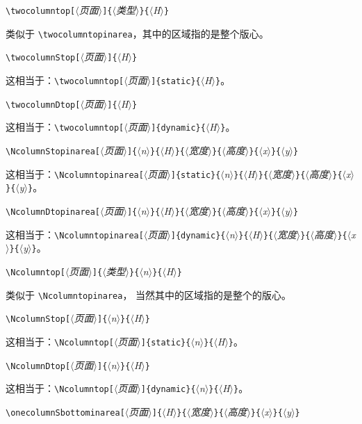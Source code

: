\documentclass[a4paper]{book}%
\newcommand{\meta}[1]{\textnormal{\ensuremath{\langle}\makebox[0pt][l]{}\emph{#1}\makebox[0pt][l]{}\ensuremath{\rangle}}}
\begin{document}
\begin{mdframed}
    \verb|\twocolumntop[|\meta{页面}\verb|]{|\meta{类型}\verb|}{|\meta{H}\verb|}|
\end{mdframed}
类似于 \verb|\twocolumntopinarea|，其中的区域指的是整个版心。
\begin{mdframed}
    \verb|\twocolumnStop[|\meta{页面}\verb|]{|\meta{H}\verb|}|
\end{mdframed}
这相当于：\verb|\twocolumntop[|\meta{页面}\verb|]{static}{|\meta{H}\verb|}|。
\begin{mdframed}
    \verb|\twocolumnDtop[|\meta{页面}\verb|]{|\meta{H}\verb|}|
\end{mdframed}
这相当于：\verb|\twocolumntop[|\meta{页面}\verb|]{dynamic}{|\meta{H}\verb|}|。
\begin{mdframed}
    \verb|\NcolumnStopinarea[|\meta{页面}\verb|]{|\meta{n}\verb|}{|\meta{H}\verb|}{|\meta{宽度}\verb|}{|\meta{高度}\verb|}{|\meta{x}\verb|}{|\meta{y}\verb|}|
\end{mdframed}
这相当于：\verb|\Ncolumntopinarea[|\meta{页面}\verb|]{static}{|\meta{n}\verb|}{|\meta{H}\verb|}{|\meta{宽度}\verb|}{|\meta{高度}\verb|}{|\meta{x}\verb|}{|\meta{y}\verb|}|。
\begin{mdframed}
    \verb|\NcolumnDtopinarea[|\meta{页面}\verb|]{|\meta{n}\verb|}{|\meta{H}\verb|}{|\meta{宽度}\verb|}{|\meta{高度}\verb|}{|\meta{x}\verb|}{|\meta{y}\verb|}|
\end{mdframed}
这相当于：\verb|\Ncolumntopinarea[|\meta{页面}\verb|]{dynamic}{|\meta{n}\verb|}{|\meta{H}\verb|}{|\meta{宽度}\verb|}{|\meta{高度}\verb|}{|\meta{x}\verb|}{|\meta{y}\verb|}|。
\begin{mdframed}
    \verb|\Ncolumntop[|\meta{页面}\verb|]{|\meta{类型}\verb|}{|\meta{n}\verb|}{|\meta{H}\verb|}|
\end{mdframed}
类似于 \verb|\Ncolumntopinarea|， 当然其中的区域指的是整个的版心。
\begin{mdframed}
    \verb|\NcolumnStop[|\meta{页面}\verb|]{|\meta{n}\verb|}{|\meta{H}\verb|}|
\end{mdframed}
这相当于：\verb|\Ncolumntop[|\meta{页面}\verb|]{static}{|\meta{n}\verb|}{|\meta{H}\verb|}|。
\begin{mdframed}
    \verb|\NcolumnDtop[|\meta{页面}\verb|]{|\meta{n}\verb|}{|\meta{H}\verb|}|
\end{mdframed}
这相当于：\verb|\Ncolumntop[|\meta{页面}\verb|]{dynamic}{|\meta{n}\verb|}{|\meta{H}\verb|}|。
\begin{mdframed}
    \verb|\onecolumnSbottominarea[|\meta{页面}\verb|]{|\meta{H}\verb|}{|\meta{宽度}\verb|}{|\meta{高度}\verb|}{|\meta{x}\verb|}{|\meta{y}\verb|}|
\end{mdframed}
\end{document}
